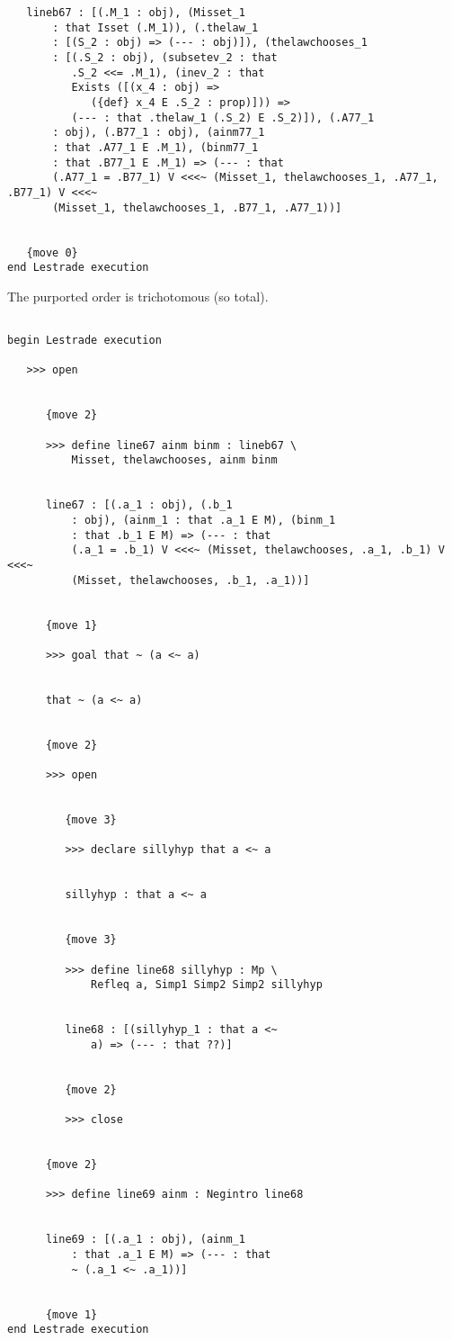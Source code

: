 \documentclass[12pt]{article}
\begin{document}
\begin{verbatim}
   lineb67 : [(.M_1 : obj), (Misset_1 
       : that Isset (.M_1)), (.thelaw_1 
       : [(S_2 : obj) => (--- : obj)]), (thelawchooses_1 
       : [(.S_2 : obj), (subsetev_2 : that 
          .S_2 <<= .M_1), (inev_2 : that 
          Exists ([(x_4 : obj) => 
             ({def} x_4 E .S_2 : prop)])) => 
          (--- : that .thelaw_1 (.S_2) E .S_2)]), (.A77_1 
       : obj), (.B77_1 : obj), (ainm77_1 
       : that .A77_1 E .M_1), (binm77_1 
       : that .B77_1 E .M_1) => (--- : that 
       (.A77_1 = .B77_1) V <<<~ (Misset_1, thelawchooses_1, .A77_1, .B77_1) V <<<~ 
       (Misset_1, thelawchooses_1, .B77_1, .A77_1))]


   {move 0}
end Lestrade execution
\end{verbatim}

The purported order is trichotomous (so total).

\begin{verbatim}

begin Lestrade execution

   >>> open


      {move 2}

      >>> define line67 ainm binm : lineb67 \
          Misset, thelawchooses, ainm binm


      line67 : [(.a_1 : obj), (.b_1 
          : obj), (ainm_1 : that .a_1 E M), (binm_1 
          : that .b_1 E M) => (--- : that 
          (.a_1 = .b_1) V <<<~ (Misset, thelawchooses, .a_1, .b_1) V <<<~ 
          (Misset, thelawchooses, .b_1, .a_1))]


      {move 1}

      >>> goal that ~ (a <~ a)


      that ~ (a <~ a)


      {move 2}

      >>> open


         {move 3}

         >>> declare sillyhyp that a <~ a


         sillyhyp : that a <~ a


         {move 3}

         >>> define line68 sillyhyp : Mp \
             Refleq a, Simp1 Simp2 Simp2 sillyhyp


         line68 : [(sillyhyp_1 : that a <~ 
             a) => (--- : that ??)]


         {move 2}

         >>> close


      {move 2}

      >>> define line69 ainm : Negintro line68


      line69 : [(.a_1 : obj), (ainm_1 
          : that .a_1 E M) => (--- : that 
          ~ (.a_1 <~ .a_1))]


      {move 1}
end Lestrade execution
\end{verbatim}
\end{document}

